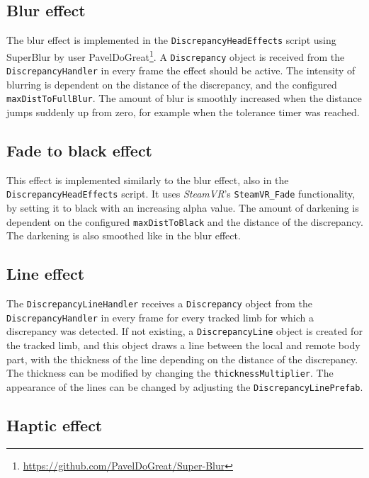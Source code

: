 \subsection{Blur effect}

The blur effect is implemented in the \texttt{DiscrepancyHeadEffects} script using SuperBlur by user PavelDoGreat\footnote{\url{https://github.com/PavelDoGreat/Super-Blur}}. A \texttt{Discrepancy} object is received from the \texttt{DiscrepancyHandler} in every frame the effect should be active. The intensity of blurring is dependent on the distance of the discrepancy, and the configured \texttt{maxDistToFullBlur}. The amount of blur is smoothly increased when the distance jumps suddenly up from zero, for example when the tolerance timer was reached.


\subsection{Fade to black effect}

This effect is implemented similarly to the blur effect, also in the \texttt{DiscrepancyHeadEffects} script. It uses \textit{SteamVR}'s \texttt{SteamVR\_Fade} functionality, by setting it to black with an increasing alpha value. The amount of darkening is dependent on the configured \texttt{maxDistToBlack} and the distance of the discrepancy. The darkening is also smoothed like in the blur effect.


\subsection{Line effect}

The \texttt{DiscrepancyLineHandler} receives a \texttt{Discrepancy} object from the \texttt{DiscrepancyHandler} in every frame for every tracked limb for which a discrepancy was detected.
\newline
If not existing, a \texttt{DiscrepancyLine} object is created for the tracked limb, and this object draws a line between the local and remote body part, with the thickness of the line depending on the distance of the discrepancy. The thickness can be modified by changing the \texttt{thicknessMultiplier}.
\newline
The appearance of the lines can be changed by adjusting the \texttt{DiscrepancyLinePrefab}.


\subsection{Haptic effect}

